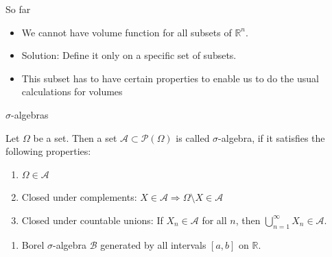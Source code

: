 \documentclass{beamer}
\newcommand{\RR}{\mathbb{R}}
\begin{document}
\begin{frame}{So far}
  \begin{itemize}
  \item We cannot have volume function for all subsets of $\RR^n$.
  \item Solution: Define it only on a specific set of subsets.
  \item This subset has to have certain properties to enable us
    to do the usual calculations for volumes
  \end{itemize}
\end{frame}

\begin{frame}{$\sigma$-algebras}
  \begin{definition}
    Let $\Omega$ be a set. Then a set $\mathcal{A} \subset \mathcal{P}(\Omega)$
    is called $\sigma$-algebra, if it satisfies the following properties:
    \begin{enumerate}
    \item $\Omega \in \mathcal{A}$
    \item Closed under complements: $X \in \mathcal{A} \Rightarrow
      \Omega\setminus X \in \mathcal{A}$
    \item Closed under countable unions: If $X_n \in \mathcal{A}$ for all $n$,
      then $\bigcup_{n=1}^\infty X_n \in \mathcal{A}$.
    \end{enumerate}
  \end{definition}

  \begin{example}
    \begin{enumerate}
    \item Borel $\sigma$-algebra $\mathcal{B}$ generated by all intervals
      $[a,b]$ on $\RR$.
    \end{enumerate}
  \end{example}
\end{frame}
\end{document}

